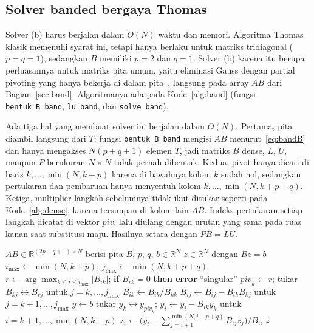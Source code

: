 \documentclass[12pt,a4paper]{article}
\newcommand{\R}{\mathbb{R}}
\numberwithin{equation}{section}
\begin{document}
\subsection{Solver banded bergaya Thomas}
Solver (b) harus berjalan dalam $O(N)$ waktu dan memori. Algoritma Thomas klasik memenuhi syarat ini, tetapi hanya
berlaku untuk matriks tridiagonal ($p=q=1$), sedangkan $B$ memiliki $p=2$ dan $q=1$. Solver (b) karena itu berupa
perluasannya untuk matriks pita umum, yaitu eliminasi Gauss dengan partial pivoting yang hanya bekerja di dalam
pita~\cite{golub}, langsung pada array $AB$ dari Bagian~\ref{sec:band}. Algoritmanya ada pada Kode~\ref{alg:band} (fungsi \texttt{bentuk\_B\_band},
\texttt{lu\_band}, dan \texttt{solve\_band}).

Ada tiga hal yang membuat solver ini berjalan dalam $O(N)$. Pertama, pita diambil langsung dari $T$: fungsi
\texttt{bentuk\_B\_band} mengisi $AB$ menurut~\eqref{eq:bandB} dan hanya mengakses $N(p+q+1)$ elemen $T$, jadi
matriks $B$ dense, $L$, $U$, maupun $P$ berukuran $N\times N$ tidak pernah dibentuk. Kedua, pivot hanya dicari di
baris $k,\dots,\min(N,k+p)$ karena di bawahnya kolom $k$ sudah nol, sedangkan pertukaran dan pembaruan hanya
menyentuh kolom $k,\dots,\min(N,k+p+q)$. Ketiga, multiplier langkah sebelumnya tidak ikut ditukar seperti pada
Kode~\ref{alg:dense}, karena tersimpan di kolom lain $AB$. Indeks pertukaran setiap langkah dicatat di vektor
$\mathit{piv}$, lalu diulang dengan urutan yang sama pada ruas kanan saat substitusi maju. Hasilnya setara dengan
$PB=LU$.

\begin{algorithm}[H]
\caption{Faktorisasi dan penyelesaian banded dengan \emph{partial pivoting}. Notasi $B_{ij}$ berarti elemen yang
disimpan di $AB_{p+q+1+i-j,\,j}$.}
\label{alg:band}
\begin{algorithmic}[1]
\Require $AB\in\R^{(2p+q+1)\times N}$ berisi pita $B$, $p$, $q$, $b\in\R^N$
\Ensure $z\in\R^N$ dengan $Bz=b$
  \State $i_{\max}\gets\min(N,k+p)$; \quad $j_{\max}\gets\min(N,k+p+q)$
  \State $r\gets\arg\max_{k\le i\le i_{\max}}\lvert B_{ik}\rvert$; \textbf{if} $B_{rk}=0$ \textbf{then error}
  ``singular''
  \State $\mathit{piv}_k\gets r$; tukar $B_{kj}\leftrightarrow B_{rj}$ untuk $j=k,\dots,j_{\max}$
    \State $B_{ik}\gets B_{ik}/B_{kk}$ 
    \State $B_{ij}\gets B_{ij}-B_{ik}B_{kj}$ untuk $j=k+1,\dots,j_{\max}$
  \EndFor
\EndFor
\State $y\gets b$
 
  \State tukar $y_k\leftrightarrow y_{\mathit{piv}_k}$; \quad
         $y_i\gets y_i-B_{ik}y_k$ untuk $i=k+1,\dots,\min(N,k+p)$
\EndFor
{} 
  \State $z_i\gets\bigl(y_i-\sum_{j=i+1}^{\min(N,i+p+q)}B_{ij}z_j\bigr)/B_{ii}$
\EndFor
\State \Return $z$
\end{algorithmic}
\end{algorithm}
\end{document}

